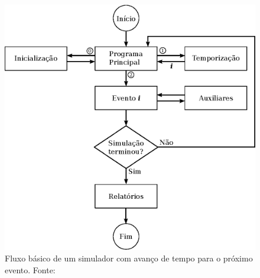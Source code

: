\begin{figure}[htb!]
\centering\includegraphics{img/simulation_flow.eps}
\caption{\label{fig:simflow}Fluxo básico de um simulador com avanço de tempo para o próximo evento. Fonte:~\cite{Law}}
\end{figure}